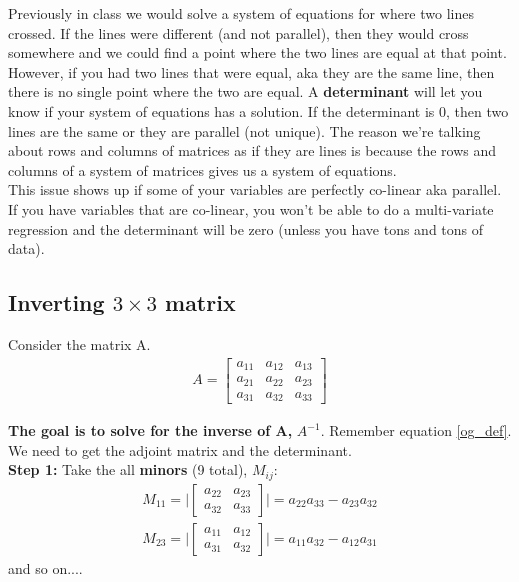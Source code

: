 \documentclass{article}
\begin{document}
Previously in class we would solve a system of equations for where two lines crossed. If the lines were different (and not parallel), then they would cross somewhere and we could find a point where the two lines are equal at that point. However, if you had two lines that were equal, aka they are the same line, then there is no single point where the two are equal. A \textbf{determinant} will let you know if your system of equations has a solution. If the determinant is 0, then two lines are the same or they are parallel (not unique). The reason we're talking about rows and columns of matrices as if they are lines is because the rows and columns of a system of matrices gives us a system of equations.  \\

This issue shows up if some of your variables are perfectly co-linear aka parallel. If you have variables that are co-linear, you won't be able to do a multi-variate regression and the determinant will be zero (unless you have tons and tons of data). 


\subsection{Inverting $3 \times 3$ matrix}

Consider the matrix A. 
\begin{align}
    A = \begin{bmatrix}
                a_{11} & a_{12} & a_{13} \\
                a_{21} & a_{22} & a_{23} \\
                a_{31} & a_{32} & a_{33}
    \end{bmatrix}
\end{align}

\textbf{The goal is to solve for the inverse of A,} $A^{-1}$. Remember equation \ref{og_def}. We need to get the adjoint matrix and the determinant. \\

\textbf{Step 1:} Take the all \textbf{minors} (9 total), $M_{ij}$: 
\begin{align}
    M_{11} = \Bigg| \begin{bmatrix}
                    a_{22} & a_{23} \\
                    a_{32} & a_{33}
    \end{bmatrix} \Bigg| = a_{22}a_{33} - a_{23} a_{32} \\
    M_{23} = \Bigg| \begin{bmatrix}
                    a_{11} & a_{12} \\
                    a_{31} & a_{32}
    \end{bmatrix} \Bigg|   = a_{11} a_{32} - a_{12} a_{31}
\end{align}
and so on.... \\
\end{document}

